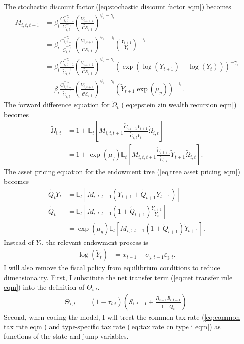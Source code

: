 \documentclass[12 pt, oneside]{article}
\theoremstyle{definition}
\theoremstyle{definition}
\theoremstyle{definition}
\newcommand{\E}{\mathbb{E}}
\newcommand{\calC}{\mathcal{C}}
\newcommand{\calE}{\mathcal{E}}
\begin{document}
The stochastic discount factor (\ref{eq:stochastic discount factor eqm}) becomes
\begin{align*}
  M_{i, t, t + 1} & = \beta_i \frac{C_{i, t + 1}^{- \gamma_i } }{C_{i, t}^{-\gamma_i} }\left(\frac{\tilde{V}_{i, t + 1}}{\tilde{\calC\calE}_{i, t}}\right)^{ \psi_i - \gamma_i}\\
               & = \beta_i\frac{\tilde{C}_{i, t + 1}^{- \gamma_i } }{\tilde{C}_{i, t}^{-\gamma_i} }\left(\frac{\tilde{V}_{i, t + 1}}{\tilde{\calC\calE}_{i, t}}\right)^{ \psi_i - \gamma_i}\left(\frac{Y_{t + 1}}{Y_t}\right)^{-\gamma_i}\\
               & = \beta_i\frac{\tilde{C}_{i, t + 1}^{- \gamma_i } }{\tilde{C}_{i, t}^{-\gamma_i} }\left(\frac{\tilde{V}_{i, t + 1}}{\tilde{\calC\calE}_{i, t}}\right)^{ \psi_i - \gamma_i}\left(\exp(\log(Y_{t + 1}) - \log(Y_t))\right)^{-\gamma_i}\\
               & = \beta_i \frac{\tilde{C}_{i, t + 1}^{- \gamma_i } }{\tilde{C}_{i, t}^{-\gamma_i} }\left(\frac{\tilde{V}_{i, t + 1}}{\tilde{\calC\calE}_{i, t}}\right)^{ \psi_i - \gamma_i}\left(\tilde{Y}_{t + 1}\exp(\mu_y)\right)^{-\gamma_i}.
\end{align*}
The forward difference equation for $\tilde{\Omega}_t$ (\ref{eq:epstein zin wealth recursion eqm}) becomes
\begin{align*}
  \tilde{\Omega}_{i, t} & = 1 + \E_t \left[M_{i, t, t + 1}\frac{\tilde{C}_{i, t + 1}Y_{t + 1}}{\tilde{C}_{i, t}Y_t}\tilde{\Omega}_{i, t}\right]\\
                  & = 1 + \exp(\mu_y)\E_t \left[M_{i, t, t + 1}\frac{\tilde{C}_{i, t + 1}}{\tilde{C}_{i, t}}\tilde{Y}_{t + 1}\tilde{\Omega}_{i, t}\right].
\end{align*}
The asset pricing equation for the endowment tree (\ref{eq:tree asset pricing eqm}) becomes
\begin{align*}
  \tilde{Q}_t Y_t & = \E_t[M_{i, t, t + 1}(Y_{t + 1} + \tilde{Q}_{t + 1} Y_{t + 1})]\\
  \tilde{Q}_t & = \E_t\left[M_{i, t, t + 1}(1 + \tilde{Q}_{t + 1})\frac{Y_{t + 1}}{Y_t}\right]\\
                  & = \exp(\mu_y)\E_t[M_{i, t, t + 1}(1 + \tilde{Q}_{t + 1})\tilde{Y}_{t + 1}].
\end{align*}
Instead of $Y_t$, the relevant endowment process is
\begin{align*}
  \log(\tilde{Y}_t) & = x_{t - 1} + \sigma_{y, t - 1} \varepsilon_{y, t}.
\end{align*}
I will also remove the fiscal policy from equilibrium conditions to reduce dimensionality. First, I substitute the net transfer term (\ref{eq:net transfer rule eqm}) into the definition of $\Theta_{i, t}$.
\begin{align*}
  \Theta_{i, t} & = (1 - \tau_{i, t})\left(S_{i, t - 1} + \frac{R_{t - 1}\tilde{B}_{i, t - 1}}{1 + \tilde{Q}_t}\right).
\end{align*}
Second, when coding the model, I will treat the common tax rate (\ref{eq:common tax rate eqm}) and type-specific tax rate (\ref{eq:tax rate on type i eqm}) as functions of the state and jump variables.
\end{document}
